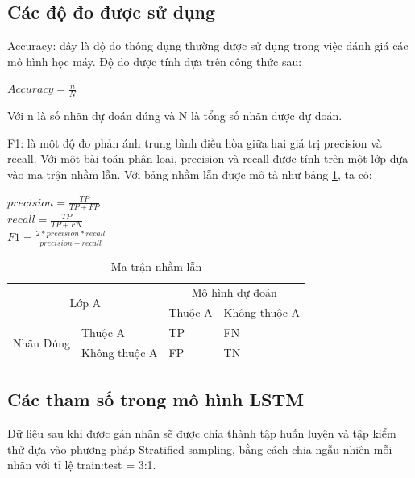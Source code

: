 \documentclass[fontsize=12pt]{scrartcl}
\begin{document}
\subsection{Các độ đo được sử dụng}
\par
Accuracy: đây là độ đo thông dụng thường được sử dụng trong việc đánh giá các mô hình học máy. Độ đo được tính dựa trên công thức sau:\\
\begin{center}
$Accuracy = \frac{n}{N}$\\
\end{center}
Với n là số nhãn dự đoán đúng và N là tổng số nhãn được dự đoán.
\par
F1: là một độ đo phản ánh trung bình điều hòa giữa hai giá trị precision và recall. Với một bài toán phân loại, precision và recall được tính trên một lớp dựa vào ma trận nhầm lẫn. Với bảng nhầm lẫn được mô tả như bảng \ref{table:con_fus_max}, ta có:\\
\begin{center}
$precision = \frac{TP}{TP+FP}$\\

$recall = \frac{TP}{TP+FN}$\\

$F1 = \frac{2*precision*recall}{precision+recall}$
\end{center}

\begin{table}[ht]
\begin{center}
  \begin{tabular}{|l|l|l|l|}
  \hline
  \multicolumn{2}{|c|}{\multirow{2}{*}{Lớp A}} & 	\multicolumn{2}{|c|}{Mô hình dự đoán}\\ 
  \cline{3-4}
  \multicolumn{2}{|l|}{} & Thuộc A & Không thuộc A  \\
  \cline{1-4}
  \multirow{2}{4em}{Nhãn Đúng} & Thuộc A & TP & FN \\ 
  \cline{2-4}
   & Không thuộc A & FP & TN \\ 
  \hline
  \end{tabular}
  \end{center}
  \caption{Ma trận nhầm lẫn}
  \label{table:con_fus_max}
\end{table}%
\subsection{Các tham số trong mô hình LSTM}
\par
Dữ liệu sau khi được gán nhãn sẽ được chia thành tập huấn luyện và tập kiểm thử  dựa vào phương pháp Stratified sampling, bằng cách chia ngẫu nhiên mỗi nhãn với tỉ lệ train:test = 3:1.
\end{document}
